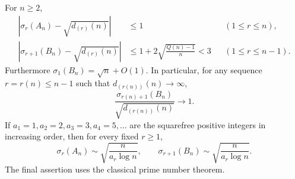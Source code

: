 \begin{theorem}\label{spec:upper}
For $n\ge2$,
\begin{align}
 \left|\sigma_r(A_n)-\sqrt{d_{(r)}(n)}\right|&\le1
 &&(1\le r\le n),\label{spec:Adegree}\\
 \left|\sigma_{r+1}(B_n)-\sqrt{d_{(r)}(n)}\right|
 &\le1+2\sqrt{\frac{Q(n)-1}{n}}<3
 &&(1\le r\le n-1).\label{spec:Bdegree}
\end{align}
Furthermore $\sigma_1(B_n)=\sqrt n+O(1)$. In particular, for any sequence $r=r(n)\le n-1$ such that $d_{(r(n))}(n)\to\infty$,
\[
 \frac{\sigma_{r(n)+1}(B_n)}{\sqrt{d_{(r(n))}(n)}}\longrightarrow1.
\]
If $a_1=1,a_2=2,a_3=3,a_4=5,\ldots$ are the squarefree positive integers in increasing order, then for every fixed $r\ge1$,
\begin{equation}\label{spec:upperfixed}
 \sigma_r(A_n)\sim\sqrt{\frac{n}{a_r\log n}},\qquad
 \sigma_{r+1}(B_n)\sim\sqrt{\frac{n}{a_r\log n}}.
\end{equation}
The final assertion uses the classical prime number theorem.
\end{theorem}

